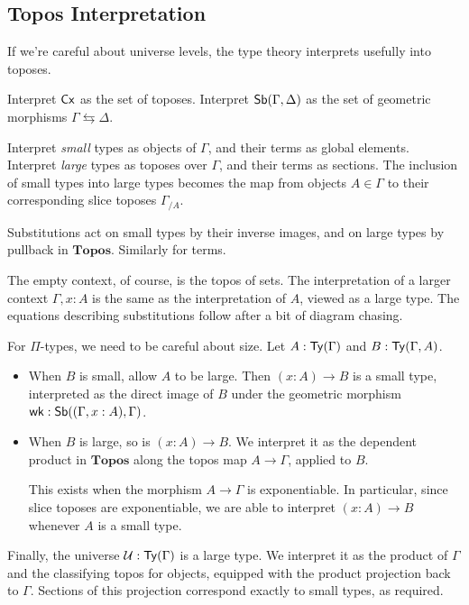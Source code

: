 \documentclass{article}
\begin{document}
\subsection{Topos Interpretation}

If we're careful about universe levels, the type theory interprets usefully into toposes.

Interpret \(\mathsf{Cx}\) as the set of toposes. Interpret \(\mathsf{Sb}(\Gamma, \Delta)\)
as the set of geometric morphisms \(\Gamma \leftrightarrows \Delta\).

Interpret \emph{small} types as objects of \(\Gamma\), and their terms as global elements.
Interpret \emph{large} types as toposes over \(\Gamma\), and their terms as sections.
The inclusion of small types into large types becomes the map from objects \(A \in \Gamma\) to their corresponding slice toposes \(\Gamma_{/A}\).

Substitutions act on small types by their inverse images, and on large types by pullback in \(\mathbf{Topos}\).
Similarly for terms.

The empty context, of course, is the topos of sets.
The interpretation of a larger context \(\Gamma, x : A\) is the same as the interpretation of \(A\), viewed as a large type.
The equations describing substitutions follow after a bit of diagram chasing.

For \(\Pi\)-types, we need to be careful about size.
Let \(A : \mathsf{Ty}(\Gamma)\) and \(B : \mathsf{Ty}(\Gamma,A)\).
\begin{itemize}
    \item When \(B\) is small, allow \(A\) to be large. Then \((x : A) \to B\) is a small type, interpreted as the direct image of \(B\) under the geometric morphism \(\mathsf{wk} : \mathsf{Sb}((\Gamma, x : A),\Gamma)\).
    \item When \(B\) is large, so is \((x : A) \to B\). We interpret it as the dependent product in \(\mathbf{Topos}\) along the topos map \(A \to \Gamma\), applied to \(B\).

    This exists when the morphism \(A \to \Gamma\) is exponentiable.
    In particular, since slice toposes are exponentiable, we are able to interpret \((x : A) \to B\) whenever \(A\) is a small type.
\end{itemize}

Finally, the universe \(\mathcal{U} : \mathsf{Ty}(\Gamma)\) is a large type.
We interpret it as the product of \(\Gamma\) and the classifying topos for objects, equipped with the product projection back to \(\Gamma\).
Sections of this projection correspond exactly to small types, as required.
\end{document}

